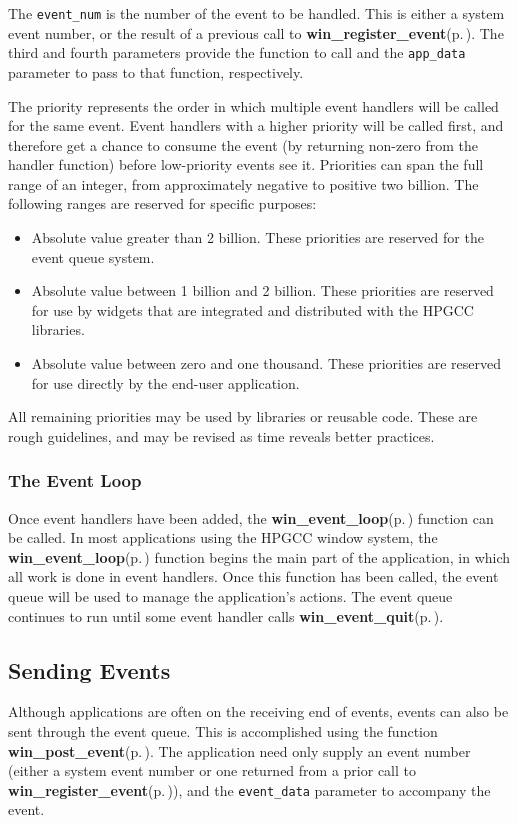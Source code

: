 The {\tt event\_\-num} is the number of the event to be handled. This is either a system event number, or the result of a previous call to {\bf win\_\-register\_\-event}{\rm (p.\,\pageref{winevent_8h_a3})}. The third and fourth parameters provide the function to call and the {\tt app\_\-data} parameter to pass to that function, respectively.

The priority represents the order in which multiple event handlers will be called for the same event. Event handlers with a higher priority will be called first, and therefore get a chance to consume the event (by returning non-zero from the handler function) before low-priority events see it. Priorities can span the full range of an integer, from approximately negative to positive two billion. The following ranges are reserved for specific purposes:

\begin{itemize}
\item Absolute value greater than 2 billion. These priorities are reserved for the event queue system. \item Absolute value between 1 billion and 2 billion. These priorities are reserved for use by widgets that are integrated and distributed with the HPGCC libraries. \item Absolute value between zero and one thousand. These priorities are reserved for use directly by the end-user application.\end{itemize}
All remaining priorities may be used by libraries or reusable code. These are rough guidelines, and may be revised as time reveals better practices.\subsubsection{The Event Loop}\label{winevent_8h_win_event}
Once event handlers have been added, the {\bf win\_\-event\_\-loop}{\rm (p.\,\pageref{winevent_8h_a7})} function can be called. In most applications using the HPGCC window system, the {\bf win\_\-event\_\-loop}{\rm (p.\,\pageref{winevent_8h_a7})} function begins the main part of the application, in which all work is done in event handlers. Once this function has been called, the event queue will be used to manage the application's actions. The event queue continues to run until some event handler calls {\bf win\_\-event\_\-quit}{\rm (p.\,\pageref{winevent_8h_a8})}.\subsection{Sending Events}\label{winevent_8h_send}
Although applications are often on the receiving end of events, events can also be sent through the event queue. This is accomplished using the function {\bf win\_\-post\_\-event}{\rm (p.\,\pageref{winevent_8h_a4})}. The application need only supply an event number (either a system event number or one returned from a prior call to {\bf win\_\-register\_\-event}{\rm (p.\,\pageref{winevent_8h_a3})}), and the {\tt event\_\-data} parameter to accompany the event.



